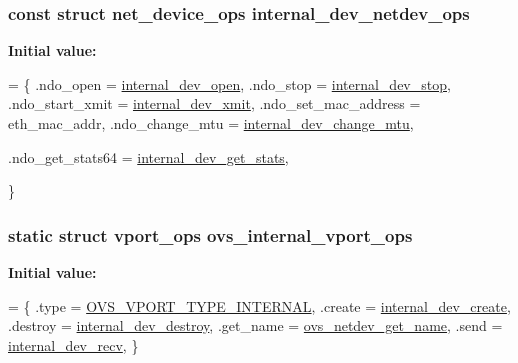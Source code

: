 \subsubsection[{internal\+\_\+dev\+\_\+netdev\+\_\+ops}]{\setlength{\rightskip}{0pt plus 5cm}const struct net\+\_\+device\+\_\+ops internal\+\_\+dev\+\_\+netdev\+\_\+ops\hspace{0.3cm}{\ttfamily [static]}}\label{linux_2vport-internal__dev_8c_af6e4b8260f029c8e987281b6e9890b8e}
{\bfseries Initial value\+:}
\begin{DoxyCode}
= \{
    .ndo\_open = \hyperlink{linux_2vport-internal__dev_8c_ad76be69f068e92dd73ee48d599a37ee3}{internal\_dev\_open},
    .ndo\_stop = \hyperlink{linux_2vport-internal__dev_8c_ac0b3dbdb4d6a02faeb1b94c46fe1ceb7}{internal\_dev\_stop},
    .ndo\_start\_xmit = \hyperlink{linux_2vport-internal__dev_8c_aafdf20e45216e64dfb927dbee0da1ec6}{internal\_dev\_xmit},
    .ndo\_set\_mac\_address = eth\_mac\_addr,
    .ndo\_change\_mtu = \hyperlink{linux_2vport-internal__dev_8c_a4a8e78d5216e9cff945747582c010613}{internal\_dev\_change\_mtu},

    .ndo\_get\_stats64 = \hyperlink{linux_2vport-internal__dev_8c_a1b51a40ab3a7e2ac5d45d0862de0eecd}{internal\_dev\_get\_stats},



\}
\end{DoxyCode}
\hypertarget{linux_2vport-internal__dev_8c_a20321257f6991e7ffb535947c382401e}{}
\subsubsection[{ovs\+\_\+internal\+\_\+vport\+\_\+ops}]{\setlength{\rightskip}{0pt plus 5cm}static struct {\bf vport\+\_\+ops} ovs\+\_\+internal\+\_\+vport\+\_\+ops\hspace{0.3cm}{\ttfamily [static]}}\label{linux_2vport-internal__dev_8c_a20321257f6991e7ffb535947c382401e}
{\bfseries Initial value\+:}
\begin{DoxyCode}
= \{
    .type       = \hyperlink{openvswitch_8h_a9a1b861aa99bd83177a2b10b34745b0aa99034286803fd0adf04dde0fa7e69f00}{OVS\_VPORT\_TYPE\_INTERNAL},
    .create     = \hyperlink{linux_2vport-internal__dev_8c_a08ffc4510ebd49d7ffdd031a112a18bb}{internal\_dev\_create},
    .destroy    = \hyperlink{linux_2vport-internal__dev_8c_ab75c92e096800c974c1d1590e797cd2d}{internal\_dev\_destroy},
    .get\_name   = \hyperlink{linux_2vport-netdev_8c_a63439e8a15ca15f649e7cd4c26a79437}{ovs\_netdev\_get\_name},
    .send       = \hyperlink{linux_2vport-internal__dev_8c_a259b00fb99d12379c06cf2b9d2de6050}{internal\_dev\_recv},
\}
\end{DoxyCode}
